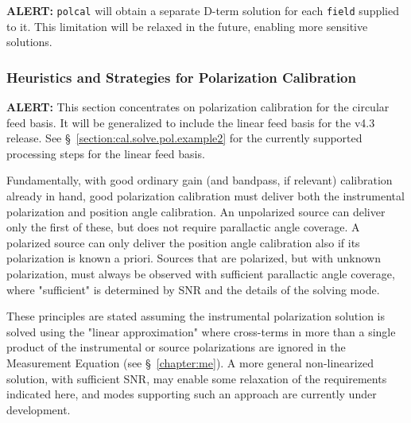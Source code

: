 {\bf ALERT:} {\tt polcal} will obtain a separate D-term solution for
each {\tt field} supplied to it.  This limitation will be relaxed in 
the future, enabling more sensitive solutions.


\subsubsection{Heuristics and Strategies for Polarization Calibration }
\label{section:cal.solve.pol.hstics}


{\bf ALERT:} This section concentrates on polarization calibration for
the circular feed basis.  It will be generalized to include the linear
feed basis for the v4.3 release.  See
\S~\ref{section:cal.solve.pol.example2} for the currently supported
processing steps for the linear feed basis.


Fundamentally, with good ordinary gain (and bandpass, if relevant)
calibration already in hand, good polarization calibration must
deliver both the instrumental polarization and position angle
calibration.  An unpolarized source can deliver only the first of
these, but does not require parallactic angle coverage.  A polarized
source can only deliver the position angle calibration also if its
polarization is known a priori.  Sources that are polarized, but with
unknown polarization, must always be observed with sufficient
parallactic angle coverage, where "sufficient" is determined by SNR
and the details of the solving mode.

These principles are stated assuming the instrumental polarization
solution is solved using the "linear approximation" where cross-terms
in more than a single product of the instrumental or source
polarizations are ignored in the Measurement Equation (see 
\S~\ref{chapter:me}).
A more general non-linearized solution, with sufficient SNR, may enable 
some relaxation of the requirements indicated here, and modes supporting
such an approach are currently under development.

